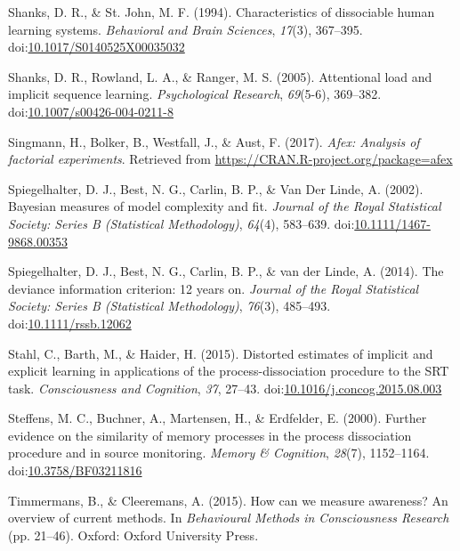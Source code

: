 \documentclass[man]{apa6}
\theoremstyle{definition}
\theoremstyle{definition}
\theoremstyle{definition}
\theoremstyle{remark}
\begin{document}
\hypertarget{ref-shanks_characteristics_1994}{}
Shanks, D. R., \& St. John, M. F. (1994). Characteristics of dissociable
human learning systems. \emph{Behavioral and Brain Sciences},
\emph{17}(3), 367--395.
doi:\href{https://doi.org/10.1017/S0140525X00035032}{10.1017/S0140525X00035032}

\hypertarget{ref-shanks_attentional_2005}{}
Shanks, D. R., Rowland, L. A., \& Ranger, M. S. (2005). Attentional load
and implicit sequence learning. \emph{Psychological Research},
\emph{69}(5-6), 369--382.
doi:\href{https://doi.org/10.1007/s00426-004-0211-8}{10.1007/s00426-004-0211-8}

\hypertarget{ref-R-afex}{}
Singmann, H., Bolker, B., Westfall, J., \& Aust, F. (2017). \emph{Afex:
Analysis of factorial experiments}. Retrieved from
\url{https://CRAN.R-project.org/package=afex}

\hypertarget{ref-spiegelhalter_bayesian_2002}{}
Spiegelhalter, D. J., Best, N. G., Carlin, B. P., \& Van Der Linde, A.
(2002). Bayesian measures of model complexity and fit. \emph{Journal of
the Royal Statistical Society: Series B (Statistical Methodology)},
\emph{64}(4), 583--639.
doi:\href{https://doi.org/10.1111/1467-9868.00353}{10.1111/1467-9868.00353}

\hypertarget{ref-spiegelhalter_deviance_2014}{}
Spiegelhalter, D. J., Best, N. G., Carlin, B. P., \& van der Linde, A.
(2014). The deviance information criterion: 12 years on. \emph{Journal
of the Royal Statistical Society: Series B (Statistical Methodology)},
\emph{76}(3), 485--493.
doi:\href{https://doi.org/10.1111/rssb.12062}{10.1111/rssb.12062}

\hypertarget{ref-stahl_distorted_2015}{}
Stahl, C., Barth, M., \& Haider, H. (2015). Distorted estimates of
implicit and explicit learning in applications of the
process-dissociation procedure to the SRT task. \emph{Consciousness and
Cognition}, \emph{37}, 27--43.
doi:\href{https://doi.org/10.1016/j.concog.2015.08.003}{10.1016/j.concog.2015.08.003}

\hypertarget{ref-steffens_further_2000}{}
Steffens, M. C., Buchner, A., Martensen, H., \& Erdfelder, E. (2000).
Further evidence on the similarity of memory processes in the process
dissociation procedure and in source monitoring. \emph{Memory \&
Cognition}, \emph{28}(7), 1152--1164.
doi:\href{https://doi.org/10.3758/BF03211816}{10.3758/BF03211816}

\hypertarget{ref-timmermans_how_2015}{}
Timmermans, B., \& Cleeremans, A. (2015). How can we measure awareness?
An overview of current methods. In \emph{Behavioural Methods in
Consciousness Research} (pp. 21--46). Oxford: Oxford University Press.
\end{document}
